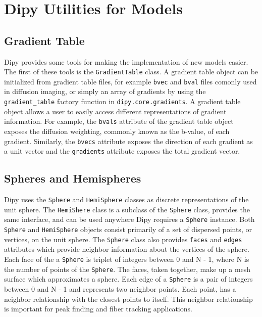 \section{Dipy Utilities for Models}

\subsection{Gradient Table}
Dipy provides some tools for making the implementation of new models easier. The first of these tools is the \verb|GradientTable| class. A gradient table object can be initialized from gradient table files, for example \verb|bvec| and \verb|bval| files comonly used in diffusion imaging, or simply an array of gradients by using the \verb|gradient_table| factory function in \verb|dipy.core.gradients|. A gradient table object allows a user to easily access different representations of gradient information. For example, the \verb|bvals| attribute of the gradient table object exposes the diffusion weighting, commonly known as the b-value, of each gradient. Similarly, the \verb|bvecs| attribute exposes the direction of each gradient as a unit vector and the \verb|gradients| attribute exposes the total gradient vector.

\subsection{Spheres and Hemispheres}
Dipy uses the \verb|Sphere| and \verb|HemiSphere| classes as discrete representations of the unit sphere. The \verb|HemiShere| class is a subclass of the \verb|Sphere| class, provides the same interface, and can be used anywhere Dipy requires a \verb|Sphere| instance.  Both \verb|Sphere| and \verb|HemiSphere| objects consist primarily of a set of dispersed points, or vertices, on the unit sphere. The \verb|Sphere| class also provides \verb|faces| and \verb|edges| attributes which provide neighbor information about the vertices of the sphere. Each face of the a \verb|Sphere| is triplet of integers between 0 and N - 1, where N is the number of points of the \verb|Sphere|. The faces, taken together, make up a mesh surface which approximates a sphere. Each edge of a \verb|Sphere| is a pair of integers between 0 and N - 1 and represents two neighbor points. Each point, has a neighbor relationship with the closest points to itself. This neighbor relationship is important for peak finding and fiber tracking applications.

